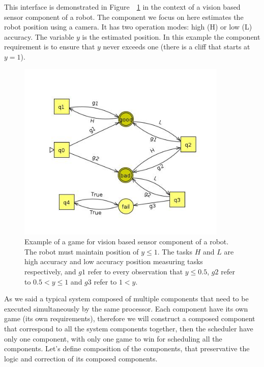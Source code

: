 \documentclass[ twoside, 12pt ]{article}
\begin{document}
This interface is demonstrated in Figure~~\ref{fig:exampleGame} in the context of a vision based sensor component of a robot. 
The component we focus on here estimates the robot position using a camera. It has two operation modes: high (H) or low (L) accuracy.
The variable $y$ is the estimated position. In this example the component requirement is to ensure that $y$ never exceeds one (there is a cliff that starts at $y=1$).

\begin{figure} [h]
    \centerline{\includegraphics[width=100mm]{gameExample.jpg}}
    \caption{Example of a game for vision based sensor component of a robot.
        The robot must maintain position of $y \le 1$.
        The tasks $H$ and $L$ are high accuracy and low accuracy position measuring tasks respectively, and
        $g1$ refer to every observation that $y \le 0.5$, $g2$ refer to $0.5 < y \le 1$ and $g3$ refer to $1 < y$. }
    \label{fig:exampleGame}
\end{figure}

As we said a typical system composed of multiple components that need to be executed simultaneously by the same processor.
Each component have its own game (its own requirements), therefore we will construct a composed component that correspond to all the system components together, then the scheduler have only one component, with only one game to win for scheduling all the components.
Let's define composition of the components, that preservative the logic and correction of its composed components.
\end{document}
